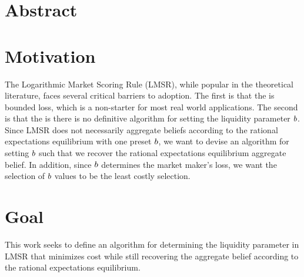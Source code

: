 \section{Abstract}

\section{Motivation}
The Logarithmic Market Scoring Rule (LMSR), while popular in the theoretical
literature, faces several critical barriers to adoption. The first is that
the  is bounded loss, which is a non-starter for most
real world applications. The second is that the  is there is no definitive algorithm for setting the liquidity parameter $b$. Since LMSR does not necessarily aggregate beliefs according to the rational expectations equilibrium with
one preset $b$, we want to devise an algorithm for setting $b$ such that we recover the rational expectations equilibrium aggregate belief. In addition, since $b$ determines the market maker's loss, we want the selection of $b$ values to be the least costly selection.

\section{Goal}
This work seeks to define an algorithm for determining the liquidity parameter in LMSR that minimizes cost while still recovering the aggregate belief according to the rational expectations equilibrium.